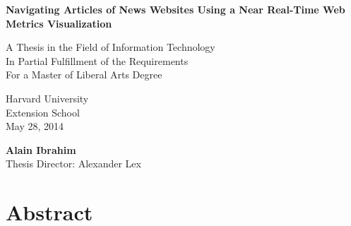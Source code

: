 \documentclass[12pt]{article}
\begin{document}

\begin{titlepage}
    \begin{center}
        \vspace*{0.5cm}
        
        \begin{doublespace}        
        \textbf{\Large Navigating Articles of News Websites Using a Near Real-Time Web Metrics Visualization}
        \vfill


        A Thesis in the Field of Information Technology \\
        In Partial Fulfillment of the Requirements \\
        For a Master of Liberal Arts Degree
        
        \vspace{0.8cm}
        
        Harvard University \\
        Extension School \\
        May 28, 2014        
        
        \vspace{1.5cm}
        
        \textbf{Alain Ibrahim} \\
        Thesis Director: Alexander Lex \\
		\end{doublespace}        
        
        \vfill
         
    \end{center}
\end{titlepage}

\tableofcontents

\vfill


\section{Abstract}
\end{document}
